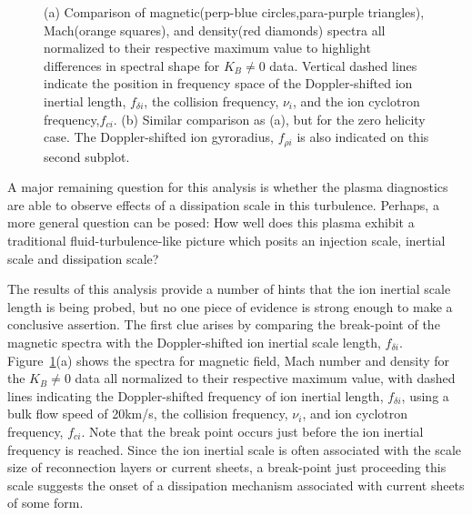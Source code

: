 \documentclass[preprint2]{aastex}
\begin{document}
\begin{figure}
\caption{\label{fig:BMD_comp} (a) Comparison of magnetic(perp-blue circles,para-purple triangles), Mach(orange squares), and density(red diamonds) spectra all normalized to their respective maximum value to highlight differences in spectral shape for $K_{B}\neq 0$ data. Vertical dashed lines indicate the position in frequency space of the Doppler-shifted ion inertial length, $f_{\delta i}$, the collision frequency, $\nu_i$, and the ion cyclotron frequency,$f_{ci}$. (b) Similar comparison as (a), but for the zero helicity case. The Doppler-shifted ion gyroradius, $f_{\rho i}$ is also indicated on this second subplot.}
\end{figure}

A major remaining question for this analysis is whether the plasma diagnostics are able to observe effects of a dissipation scale in this turbulence. Perhaps, a more general question can be posed: How well does this plasma exhibit a traditional fluid-turbulence-like picture which posits an injection scale, inertial scale and dissipation scale?

The results of this analysis provide a number of hints that the ion inertial scale length is being probed, but no one piece of evidence is strong enough to make a conclusive assertion. The first clue arises by comparing the break-point of the magnetic spectra with the Doppler-shifted ion inertial scale length, $f_{\delta i}$. Figure~\ref{fig:BMD_comp}(a) shows the spectra for magnetic field, Mach number and density for the $K_{B}\neq 0$ data all normalized to their respective maximum value, with dashed lines indicating the Doppler-shifted frequency of ion inertial length, $f_{\delta i}$, using a bulk flow speed of 20km/s, the collision frequency, $\nu_{i}$, and ion cyclotron frequency, $f_{ci}$. Note that the break point occurs just before the ion inertial frequency is reached. Since the ion inertial scale is often associated with the scale size of reconnection layers or current sheets, a break-point just proceeding this scale suggests the onset of a dissipation mechanism associated with current sheets of some form.
\end{document}
